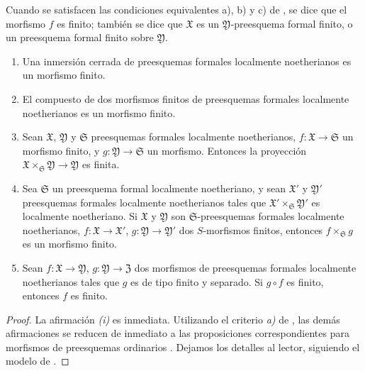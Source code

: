 \begin{definition}[4.8.2]
\label{III.4.8.2}
\label{III.4.8.2-fr}
Cuando se satisfacen las condiciones equivalentes \textup{a)}, \textup{b)} y \textup{c)}
de , se dice que el morfismo $f$ es
finito; también se dice que $\mathfrak X$ es un
$\mathfrak Y$-preesquema formal finito, o un preesquema
formal finito sobre $\mathfrak Y$.
\end{definition}

\begin{proposition}[4.8.3]
\label{III.4.8.3}
\label{III.4.8.3-fr}
\begin{enumerate}
  \item[\rm{(i)}] Una inmersión cerrada de preesquemas formales localmente
    noetherianos es un morfismo finito.
  \item[\rm{(ii)}] El compuesto de dos morfismos finitos de preesquemas formales
    localmente noetherianos es un morfismo finito.
  \item[\rm{(iii)}] Sean $\mathfrak X$, $\mathfrak Y$ y
    $\mathfrak S$ preesquemas formales localmente noetherianos,
    $f:\mathfrak X\to\mathfrak S$ un morfismo finito, y
    $g:\mathfrak Y\to\mathfrak S$ un morfismo. Entonces la proyección
    $\mathfrak X\times_{\mathfrak S}\mathfrak Y\to\mathfrak Y$
    es finita.
  \item[\rm{(iv)}] Sea $\mathfrak S$ un preesquema formal localmente
    noetheriano, y sean $\mathfrak X'$ y $\mathfrak Y'$
    preesquemas formales localmente noetherianos tales que
    $\mathfrak X'\times_{\mathfrak S}\mathfrak Y'$ es localmente
    noetheriano. Si $\mathfrak X$ y $\mathfrak Y$ son
    $\mathfrak S$-preesquemas formales localmente noetherianos,
  $f:\mathfrak X\to\mathfrak X'$, $g:\mathfrak Y\to\mathfrak Y'$ dos
  $S$-morfismos finitos, entonces
    $f\times_{\mathfrak S}g$ es un
  morfismo finito.
\item[\textup{(v)}] Sean $f:\mathfrak X\to\mathfrak Y$,
  $g:\mathfrak Y\to\mathfrak Z$ dos morfismos de preesquemas formales
  localmente noetherianos tales que $g$ es de tipo finito y separado. Si $g\circ f$ es finito,
    entonces $f$ es finito.
\end{enumerate}
\end{proposition}

\begin{proof}
La afirmación \emph{(i)} es inmediata. Utilizando el criterio \emph{a)} de
, las demás afirmaciones se reducen de inmediato a las
proposiciones correspondientes para morfismos de preesquemas ordinarios
. Dejamos los detalles al lector, siguiendo
el modelo de .
\end{proof}

